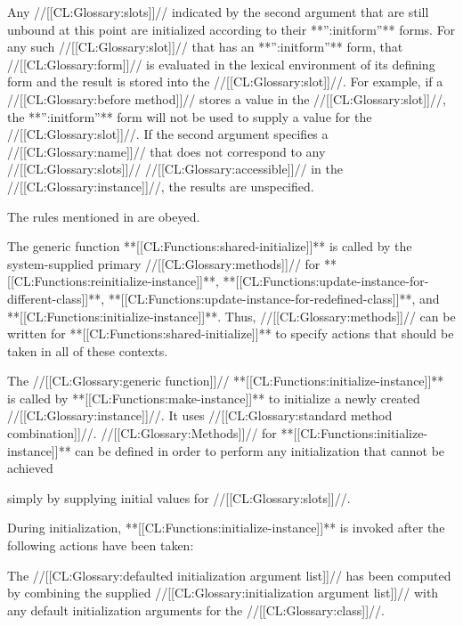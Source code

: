 \itemitem{\bull} Any //[[CL:Glossary:slots]]// 
indicated by the second argument that are still
unbound at this point are initialized according to their 
**'':initform''** forms.  For any such //[[CL:Glossary:slot]]// 
that has an **'':initform''** form,
that //[[CL:Glossary:form]]// is evaluated in the 
lexical environment of its defining 
 form and the result is stored into the //[[CL:Glossary:slot]]//.  
For example,
if a //[[CL:Glossary:before method]]// stores a value in the 
//[[CL:Glossary:slot]]//, the **'':initform''** form will not be used to supply a value 
for the //[[CL:Glossary:slot]]//.  If
the second argument specifies a //[[CL:Glossary:name]]// that does not correspond to any
//[[CL:Glossary:slots]]// //[[CL:Glossary:accessible]]// 
in the //[[CL:Glossary:instance]]//, the results are unspecified.

\itemitem{\bull} The rules mentioned in {\secref\InitargRules} are obeyed.

\endlist
                      
The generic function **[[CL:Functions:shared-initialize]]** is called by the
system-supplied primary //[[CL:Glossary:methods]]// 
for **[[CL:Functions:reinitialize-instance]]**,
**[[CL:Functions:update-instance-for-different-class]]**, 
**[[CL:Functions:update-instance-for-redefined-class]]**, and 
**[[CL:Functions:initialize-instance]]**.  Thus, //[[CL:Glossary:methods]]// can be written for 
**[[CL:Functions:shared-initialize]]** to specify actions that should be taken in all of
these contexts.

\endsubsection%

                      
The //[[CL:Glossary:generic function]]// **[[CL:Functions:initialize-instance]]** is called by 
**[[CL:Functions:make-instance]]** to initialize a newly created //[[CL:Glossary:instance]]//.
It uses //[[CL:Glossary:standard method combination]]//.  //[[CL:Glossary:Methods]]// for 
**[[CL:Functions:initialize-instance]]** can be defined in order to perform any
initialization that cannot be achieved 


simply by supplying initial values for //[[CL:Glossary:slots]]//.

                        
During initialization, **[[CL:Functions:initialize-instance]]** is invoked
after the following actions have been taken:

\beginlist 

\itemitem{\bull} The //[[CL:Glossary:defaulted initialization argument list]]// 
has been computed by combining the supplied //[[CL:Glossary:initialization argument list]]// 
with any default initialization arguments for the //[[CL:Glossary:class]]//.

